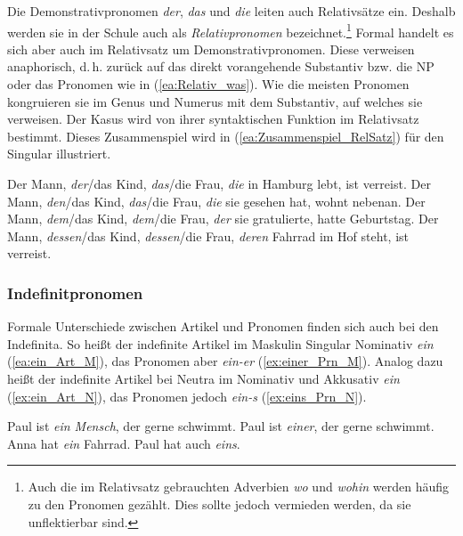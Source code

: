 Die Demonstrativpronomen \textit{der}, \textit{das} und \textit{die} leiten auch Relativsätze ein. Deshalb werden sie in der Schule auch als \textit{Relativpronomen} bezeichnet.\footnote{Auch die im Relativsatz gebrauchten Adverbien \textit{wo} und \textit{wohin} werden häufig zu den Pronomen gezählt. Dies sollte jedoch vermieden werden, da sie unflektierbar sind.} Formal handelt es sich aber auch im Relativsatz um Demonstrativpronomen. Diese verweisen anaphorisch, d.\,h. zurück auf das direkt vorangehende Substantiv bzw. die NP oder das Pronomen wie in (\ref{ea:Relativ_was}). Wie die meisten Pronomen kongruieren sie im Genus und Numerus mit dem Substantiv, auf welches sie verweisen. Der Kasus wird von ihrer syntaktischen Funktion im Relativsatz bestimmt. Dieses Zusammenspiel wird in (\ref{ea:Zusammenspiel_RelSatz}) für den Singular illustriert.

\ea \label{ea:Zusammenspiel_RelSatz}
\ea \label{ea:Rel_Nom} Der Mann, \textit{der}/das Kind, \textit{das}/die Frau, \textit{die} in Hamburg lebt, ist verreist.
\ex \label{ex:Rel_Akk} Der Mann, \textit{den}/das Kind, \textit{das}/die Frau, \textit{die} sie gesehen hat, wohnt nebenan.
\ex \label{ex:Rel_Dat} Der Mann, \textit{dem}/das Kind, \textit{dem}/die Frau, \textit{der} sie gratulierte, hatte Geburtstag.
\ex \label{ex:Rel_Gen} Der Mann, \textit{dessen}/das Kind, \textit{dessen}/die Frau, \textit{deren} Fahrrad im Hof steht, ist verreist.
\z 
\z 


\subsubsection{Indefinitpronomen}\label{subsubsection:Indefinitpronomen}
 
Formale Unterschiede zwischen Artikel und Pronomen finden sich auch bei den Indefinita. So heißt der indefinite Artikel im Maskulin Singular Nominativ \textit{ein} (\ref{ea:ein_Art_M}), das Pronomen aber \textit{ein-er} (\ref{ex:einer_Prn_M}). Analog dazu heißt der indefinite Artikel bei Neutra im Nominativ und Akkusativ \textit{ein} (\ref{ex:ein_Art_N}), das Pronomen jedoch \textit{ein-s} (\ref{ex:eins_Prn_N}).

\ea \label{ea:indef_Art_Prn}
\ea \label{ea:ein_Art_M} Paul ist \textit{ein Mensch}, der gerne schwimmt.
\ex \label{ex:einer_Prn_M} Paul ist \textit{einer}, der gerne schwimmt.
\ex \label{ex:ein_Art_N} Anna hat \textit{ein} Fahrrad.
\ex \label{ex:eins_Prn_N} Paul hat auch \textit{eins}.
\z 
\z 

